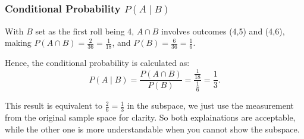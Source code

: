 \begin{example}
\begin{center}
\end{center}

\subsubsection*{Conditional Probability \(P(A \mid B)\)}
With \(B\) set as the first roll being 4, \(A \cap B\) involves outcomes (4,5) and (4,6), making \(P(A \cap B) = \frac{2}{36} = \frac{1}{18}\), and \(P(B) = \frac{6}{36} = \frac{1}{6}\).

Hence, the conditional probability is calculated as:
\[
P(A \mid B) = \frac{P(A \cap B)}{P(B)} = \frac{\frac{1}{18}}{\frac{1}{6}} = \frac{1}{3}.
\]
\begin{remark}
    This result is equivalent to $\frac{2}{6}=\frac{1}{3}$ in the subspace, we just use the measurement from the original sample space for clarity.
    So both explainations are acceptable, while the other one is more understandable when you cannot show the subspace.
\end{remark}
\end{example}

